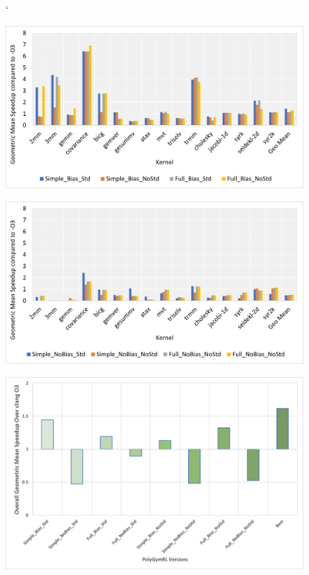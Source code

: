 \documentclass[logo,msc]{infthesis}           %
\begin{document}
\begin{figure}`
\centering
\begin{minipage}{.45\linewidth}
  \includegraphics[width=\linewidth]{Images/Bias_Chart.png}
  \label{fig:Bias_Chart}
\end{minipage}
\hspace{.05\linewidth}
\begin{minipage}{.45\linewidth}
  \includegraphics[width=\linewidth]{Images/NoBias_Chart.png}
  \label{fig:NoBias_Chart}
\end{minipage}
\end{figure}

\begin{figure}
\centering
\includegraphics[width=\linewidth]{Images/PolyGymRL_Versions.png}
\label{fig:PolyGymRL_Versions}
\end{figure}
\end{document}
